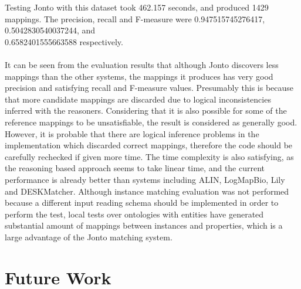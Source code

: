 Testing Jonto with this dataset took 462.157 seconds, and produced 1429 mappings. The precision, recall and F-measure were 0.947515745276417, 0.5042830540037244, and\\0.6582401555663588 respectively.
\\\\
It can be seen from the evaluation results that although Jonto discovers less mappings than the other systems, the mappings it produces has very good precision and satisfying recall and F-measure values. Presumably this is because that more candidate mappings are discarded due to logical inconsistencies inferred with the reasoners. Considering that it is also possible for some of the reference mappings to be unsatisfiable, the result is considered as generally good. However, it is probable that there are logical inference problems in the implementation which discarded correct mappings, therefore the code should be carefully rechecked if given more time. The time complexity is also satisfying, as the reasoning based approach seems to take linear time, and the current performance is already better than systems including ALIN, LogMapBio, Lily and DESKMatcher. Although instance matching evaluation was not performed because a different input reading schema should be implemented in order to perform the test, local tests over ontologies with entities have generated substantial amount of mappings between instances and properties, which is a large advantage of the Jonto matching system.


\section{Future Work}

